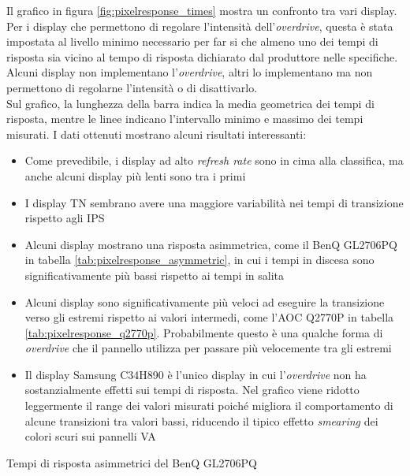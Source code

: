 Il grafico in figura \ref{fig:pixelresponse_times} mostra un confronto tra vari display. Per i display che permettono di regolare l'intensità dell'\textit{overdrive}, questa è stata impostata al livello minimo necessario per far si che almeno uno dei tempi di risposta sia vicino al tempo di risposta dichiarato dal produttore nelle specifiche. Alcuni display non implementano l'\textit{overdrive}, altri lo implementano ma non permettono di regolarne l'intensità o di disattivarlo.\\
Sul grafico, la lunghezza della barra indica la media geometrica dei tempi di risposta, mentre le linee indicano l'intervallo minimo e massimo dei tempi misurati. I dati ottenuti mostrano alcuni risultati interessanti:\begin{itemize}
	\item Come prevedibile, i display ad alto \textit{refresh rate} sono in cima alla classifica, ma anche alcuni display più lenti sono tra i primi
	\item I display TN sembrano avere una maggiore variabilità nei tempi di transizione rispetto agli IPS
	\item Alcuni display mostrano una risposta asimmetrica, come il BenQ GL2706PQ in tabella \ref{tab:pixelresponse_asymmetric}, in cui i tempi in discesa sono significativamente più bassi rispetto ai tempi in salita
	\item Alcuni display sono significativamente più veloci ad eseguire la transizione verso gli estremi rispetto ai valori intermedi, come l'AOC Q2770P in tabella \ref{tab:pixelresponse_q2770p}. Probabilmente questo è una qualche forma di \textit{overdrive} che il pannello utilizza per passare più velocemente tra gli estremi
	\item Il display Samsung C34H890 è l'unico display in cui l'\textit{overdrive} non ha sostanzialmente effetti sui tempi di risposta. Nel grafico viene ridotto leggermente il range dei valori misurati poiché migliora il comportamento di alcune transizioni tra valori bassi, riducendo il tipico effetto \textit{smearing} dei colori scuri sui pannelli VA
\end{itemize}

\begin{table}[h!]
	\centering
	\caption{\label{tab:pixelresponse_asymmetric}Tempi di risposta asimmetrici del BenQ GL2706PQ}
\end{table}

